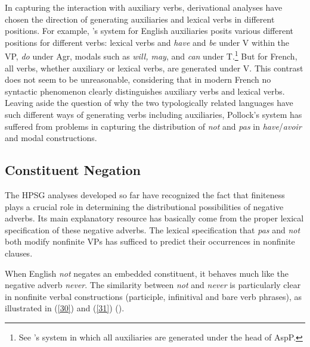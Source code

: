 \documentclass[output=paper
                ,modfonts
		,nonflat
	        ,collection
	        ,collectionchapter
	        ,collectiontoclongg
 	        ,biblatex  
                ,babelshorthands
                ,newtxmath
                ,draftmode
                ,colorlinks, citecolor=brown 
]{./langsci/langscibook}
\begin{document}
{\begin{exe}
\begin{xlist}
\begin{exe}
\begin{xlist}
{In capturing the interaction with auxiliary verbs, derivational analyses have chosen the direction of generating
auxiliaries and lexical  verbs in different positions. For example,
\citet{Pollock:89}'s system for English auxiliaries posits
various different positions for different verbs: lexical
verbs and \textit{have} and \textit{be} under V within the VP,
\textit{do} under Agr, modals such as \textit{will, may}, and \textit{can}
under T.\footnote{See \citep{Ouhalla:91}'s system in which
all auxiliaries are generated under the head of AspP.} But for French,
all verbs, whether
auxiliary or lexical  verbs, are generated under V.
This contrast does not seem to be unreasonable, considering that in
modern French no syntactic phenomenon clearly distinguishes auxiliary
verbs and lexical  verbs. Leaving aside the question of why the two
typologically related languages have such different ways of generating
verbs including auxiliaries, Pollock's system has suffered
from problems in capturing the distribution of \textit{not} and
\textit{pas} in \emph{have}/\emph{avoir} and modal constructions.}
\fi

\subsection{Constituent Negation}

The HPSG analyses developed so far have recognized
the fact that finiteness plays a crucial role in
determining the distributional possibilities of negative
adverbs. Its main explanatory resource
has basically come from the proper lexical specification of these negative
adverbs. The lexical specification that \emph{pas} and
\emph{not} both modify nonfinite VPs has sufficed to predict their
occurrences in nonfinite clauses.

When English \textit{not} negates an embedded constituent, it behaves
much like the negative adverb \textit{never}. The similarity between {\it
not} and \textit{never} is particularly clear in nonfinite verbal
constructions (participle, infinitival and bare verb phrases), as
illustrated in (\ref{30}) and (\ref{31}) (\citep{Klima:64, Baker:89,Baker:91}).


\end{xlist}
\end{exe}
\end{xlist}
\end{exe}}
\end{document}
